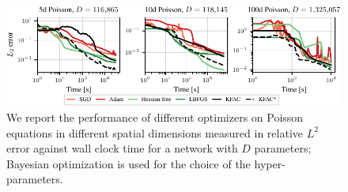 \begin{figure}
  \centering
  \includegraphics{../kfac_pinns_exp/exp33_poisson_bayes_groupplot/l2_error_over_time.pdf}
  \caption{
    We report the performance of different optimizers on Poisson equations in different spatial dimensions measured in relative $L^2$ error against wall clock time for a network with $D$ parameters; Bayesian optimization is used for the choice of the hyper-parameters.
  }
  \label{fig:10D-Poisson}
\end{figure}


